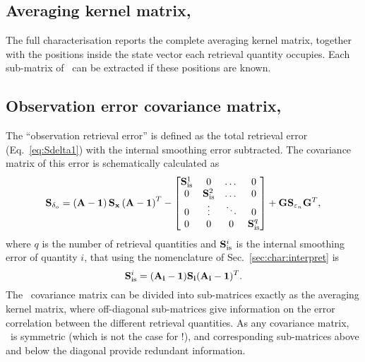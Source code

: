 \subsection{Averaging kernel matrix, \AvrKrnMtr}
\label{sec:A}
%
The full characterisation reports the complete averaging kernel matrix,
together with the positions inside the state vector each retrieval quantity
occupies. Each sub-matrix of \AvrKrnMtr\ can be extracted if these positions
are known. 
\\


\subsection{Observation error covariance matrix, }
\label{sec:Sreterr}
%
The ``observation retrieval error'' is defined as the total retrieval error
(Eq.~\ref{eq:Sdelta1}) with the internal smoothing error subtracted. The
covariance matrix of this error is schematically calculated as
\begin{equation}
  \label{eq:Sdeltao}
  \mathbf{S}_{\delta_o} = \left(\mathbf{A}-\mathbf{1}\right)\mathbf{S}_{\mathbf{x}}
  \left(\mathbf{A}-\mathbf{1}\right)^T -
  \begin{bmatrix}
  \mathbf{S}_\mathrm{is}^1 & 0 & \dots & 0 \\
  0 & \mathbf{S}_\mathrm{is}^2 & \dots & 0 \\
  0 & \vdots & \ddots & 0 \\
  0 & 0 & 0 &  \mathbf{S}_\mathrm{is}^q
  \end{bmatrix} 
  + \mathbf{G}\mathbf{S}_{\varepsilon_n}\mathbf{G}^T,
\end{equation}
where $q$ is the number of retrieval quantities and $\mathbf{S}_\mathrm{is}^i$ is
the internal smoothing error of quantity $i$, that using the nomenclature of
Sec.~\ref{sec:char:interpret} is
\begin{displaymath}
  \mathbf{S}_\mathrm{is}^i = (\mathbf{A}_{\mathbf{i}}-\mathbf{1})\mathbf{S}_{\mathbf{i}}
(\mathbf{A}_{\mathbf{i}}-\mathbf{1})^T.
\end{displaymath}
The \ covariance matrix can be divided into sub-matrices
exactly as the averaging kernel matrix, where off-diagonal sub-matrices give
information on the error correlation between the different retrieval
quantities. As any covariance matrix, \ is symmetric (which is not
the case for \AvrKrnMtr!), and corresponding sub-matrices above and below the
diagonal provide redundant information.
\\


